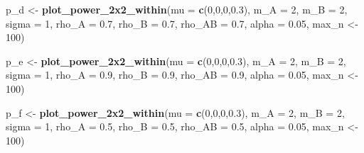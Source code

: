 \documentclass[]{article}
\newenvironment{Shaded}{\begin{snugshade}}{\end{snugshade}}
\newcommand{\KeywordTok}[1]{\textcolor[rgb]{0.13,0.29,0.53}{\textbf{#1}}}
\newcommand{\DataTypeTok}[1]{\textcolor[rgb]{0.13,0.29,0.53}{#1}}
\newcommand{\DecValTok}[1]{\textcolor[rgb]{0.00,0.00,0.81}{#1}}
\newcommand{\FloatTok}[1]{\textcolor[rgb]{0.00,0.00,0.81}{#1}}
\newcommand{\StringTok}[1]{\textcolor[rgb]{0.31,0.60,0.02}{#1}}
\newcommand{\NormalTok}[1]{#1}
\begin{document}
\begin{Shaded}
\begin{Highlighting}[]
\NormalTok{p_d <-}\StringTok{ }\KeywordTok{plot_power_2x2_within}\NormalTok{(}\DataTypeTok{mu =} \KeywordTok{c}\NormalTok{(}\DecValTok{0}\NormalTok{,}\DecValTok{0}\NormalTok{,}\DecValTok{0}\NormalTok{,}\FloatTok{0.3}\NormalTok{), }
                      \DataTypeTok{m_A =} \DecValTok{2}\NormalTok{, }
                      \DataTypeTok{m_B =} \DecValTok{2}\NormalTok{, }
                      \DataTypeTok{sigma =} \DecValTok{1}\NormalTok{, }
                      \DataTypeTok{rho_A =} \FloatTok{0.7}\NormalTok{, }
                      \DataTypeTok{rho_B =} \FloatTok{0.7}\NormalTok{, }
                      \DataTypeTok{rho_AB =} \FloatTok{0.7}\NormalTok{, }
                      \DataTypeTok{alpha =} \FloatTok{0.05}\NormalTok{,}
\NormalTok{                      max_n <-}\StringTok{ }\DecValTok{100}\NormalTok{)}

\NormalTok{p_e <-}\StringTok{ }\KeywordTok{plot_power_2x2_within}\NormalTok{(}\DataTypeTok{mu =} \KeywordTok{c}\NormalTok{(}\DecValTok{0}\NormalTok{,}\DecValTok{0}\NormalTok{,}\DecValTok{0}\NormalTok{,}\FloatTok{0.3}\NormalTok{), }
                      \DataTypeTok{m_A =} \DecValTok{2}\NormalTok{, }
                      \DataTypeTok{m_B =} \DecValTok{2}\NormalTok{, }
                      \DataTypeTok{sigma =} \DecValTok{1}\NormalTok{, }
                      \DataTypeTok{rho_A =} \FloatTok{0.9}\NormalTok{, }
                      \DataTypeTok{rho_B =} \FloatTok{0.9}\NormalTok{, }
                      \DataTypeTok{rho_AB =} \FloatTok{0.9}\NormalTok{, }
                      \DataTypeTok{alpha =} \FloatTok{0.05}\NormalTok{,}
\NormalTok{                      max_n <-}\StringTok{ }\DecValTok{100}\NormalTok{)}

\NormalTok{p_f <-}\StringTok{ }\KeywordTok{plot_power_2x2_within}\NormalTok{(}\DataTypeTok{mu =} \KeywordTok{c}\NormalTok{(}\DecValTok{0}\NormalTok{,}\DecValTok{0}\NormalTok{,}\DecValTok{0}\NormalTok{,}\FloatTok{0.3}\NormalTok{), }
                      \DataTypeTok{m_A =} \DecValTok{2}\NormalTok{, }
                      \DataTypeTok{m_B =} \DecValTok{2}\NormalTok{, }
                      \DataTypeTok{sigma =} \DecValTok{1}\NormalTok{, }
                      \DataTypeTok{rho_A =} \FloatTok{0.5}\NormalTok{, }
                      \DataTypeTok{rho_B =} \FloatTok{0.5}\NormalTok{, }
                      \DataTypeTok{rho_AB =} \FloatTok{0.5}\NormalTok{, }
                      \DataTypeTok{alpha =} \FloatTok{0.05}\NormalTok{,}
\NormalTok{                      max_n <-}\StringTok{ }\DecValTok{100}\NormalTok{)}


\end{Highlighting}
\end{Shaded}
\end{document}
